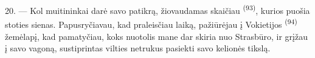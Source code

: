 20. --- Kol muitininkai darė savo patikrą, žiovaudamas skaičiau 
\textsuperscript{(93)}, kurios puošia stoties sienas. Papusryčiavau, kad praleisčiau
laiką, pažiūrėjau į Vokietijos  \textsuperscript{(94)} žemėlapį, kad
pamatyčiau, koks nuotolis mane dar skiria nuo Strasbūro, ir grįžau į savo vagoną,
sustiprintas vilties netrukus pasiekti savo kelionės tikslą.

\VUsaut{6.0mm}
\VUfilet{22mm}

